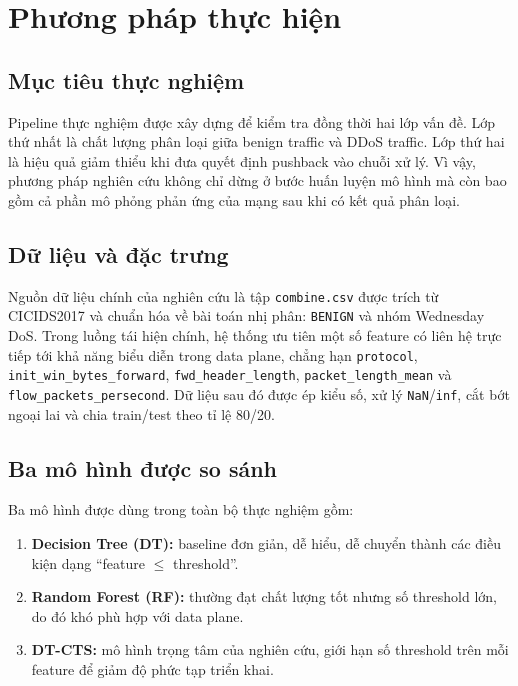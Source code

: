 \section{Phương pháp thực hiện}

\subsection{Mục tiêu thực nghiệm}

Pipeline thực nghiệm được xây dựng để kiểm tra đồng thời hai lớp vấn đề. Lớp thứ nhất là chất lượng phân loại giữa benign traffic và DDoS traffic. Lớp thứ hai là hiệu quả giảm thiểu khi đưa quyết định pushback vào chuỗi xử lý. Vì vậy, phương pháp nghiên cứu không chỉ dừng ở bước huấn luyện mô hình mà còn bao gồm cả phần mô phỏng phản ứng của mạng sau khi có kết quả phân loại.

\subsection{Dữ liệu và đặc trưng}

Nguồn dữ liệu chính của nghiên cứu là tập \texttt{combine.csv} được trích từ CICIDS2017 và chuẩn hóa về bài toán nhị phân: \texttt{BENIGN} và nhóm Wednesday DoS. Trong luồng tái hiện chính, hệ thống ưu tiên một số feature có liên hệ trực tiếp tới khả năng biểu diễn trong data plane, chẳng hạn \texttt{protocol}, \texttt{init\_win\_bytes\_forward}, \texttt{fwd\_header\_length}, \texttt{packet\_length\_mean} và \texttt{flow\_packets\_persecond}. Dữ liệu sau đó được ép kiểu số, xử lý \texttt{NaN}/\texttt{inf}, cắt bớt ngoại lai và chia train/test theo tỉ lệ 80/20.

\subsection{Ba mô hình được so sánh}

Ba mô hình được dùng trong toàn bộ thực nghiệm gồm:
\begin{enumerate}
\item \textbf{Decision Tree (DT):} baseline đơn giản, dễ hiểu, dễ chuyển thành các điều kiện dạng ``feature $\le$ threshold''.
\item \textbf{Random Forest (RF):} thường đạt chất lượng tốt nhưng số threshold lớn, do đó khó phù hợp với data plane.
\item \textbf{DT-CTS:} mô hình trọng tâm của nghiên cứu, giới hạn số threshold trên mỗi feature để giảm độ phức tạp triển khai.
\end{enumerate}

